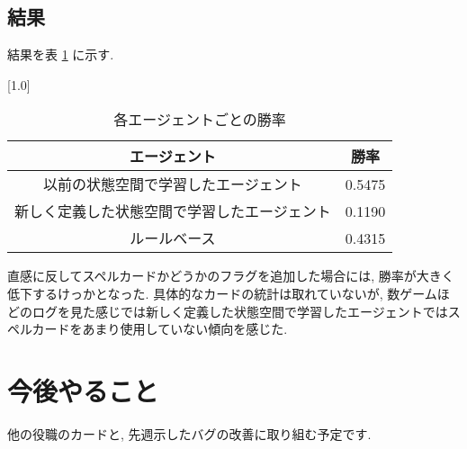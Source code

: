 \documentclass{jarticle}     %
\begin{document}
\subsection{結果}
結果を表 \ref{table:result} に示す.
\begin{table}[ht]
  \centering
  \caption{各エージェントごとの勝率}
  \vspace{-0.3cm}
  \label{table:result}
  \scalebox{1.0}[1.0]{
    \begin{tabular}{|c|c|}
      \hline
      エージェント  & 勝率 \\ \hline
      以前の状態空間で学習したエージェント & 0.5475 \\ \hline
      新しく定義した状態空間で学習したエージェント & 0.1190 \\ \hline
      ルールベース & 0.4315 \\ \hline
      \end{tabular}
  }
  \end{table}

直感に反してスペルカードかどうかのフラグを追加した場合には, 勝率が大きく低下するけっかとなった. 具体的なカードの統計は取れていないが, 数ゲームほどのログを見た感じでは新しく定義した状態空間で学習したエージェントではスペルカードをあまり使用していない傾向を感じた. 

\section{今後やること}
他の役職のカードと, 先週示したバグの改善に取り組む予定です.






\end{document}
